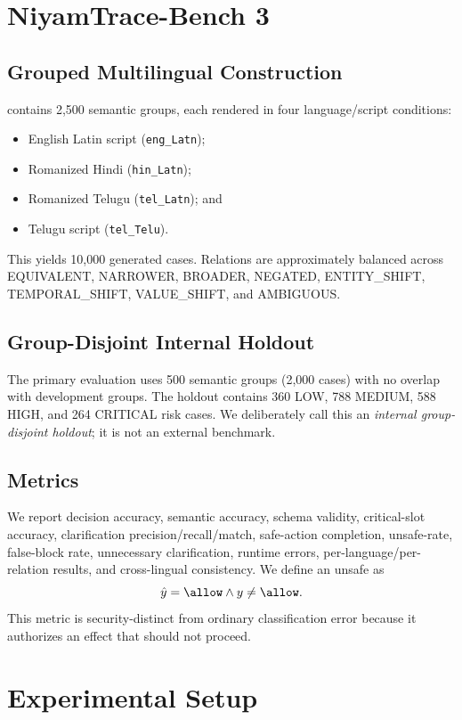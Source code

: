 \section{NiyamTrace-Bench 3}

\subsection{Grouped Multilingual Construction}
\bench contains 2,500 semantic groups, each rendered in four language/script conditions:
\begin{itemize}
  \item English Latin script (\texttt{eng\_Latn});
  \item Romanized Hindi (\texttt{hin\_Latn});
  \item Romanized Telugu (\texttt{tel\_Latn}); and
  \item Telugu script (\texttt{tel\_Telu}).
\end{itemize}
This yields 10,000 generated cases. Relations are approximately balanced across EQUIVALENT, NARROWER, BROADER, NEGATED, ENTITY\_SHIFT, TEMPORAL\_SHIFT, VALUE\_SHIFT, and AMBIGUOUS.

\subsection{Group-Disjoint Internal Holdout}
The primary evaluation uses 500 semantic groups (2,000 cases) with no overlap with development groups. The holdout contains 360 LOW, 788 MEDIUM, 588 HIGH, and 264 CRITICAL risk cases. We deliberately call this an \emph{internal group-disjoint holdout}; it is not an external benchmark.

\subsection{Metrics}
We report decision accuracy, semantic accuracy, schema validity, critical-slot accuracy, clarification precision/recall/match, safe-action completion, unsafe-\allow rate, false-block rate, unnecessary clarification, runtime errors, per-language/per-relation results, and cross-lingual consistency. We define an unsafe \allow as
\begin{equation}
  \hat y=\allow \land y\neq\allow.
\end{equation}
This metric is security-distinct from ordinary classification error because it authorizes an effect that should not proceed.

\section{Experimental Setup}

